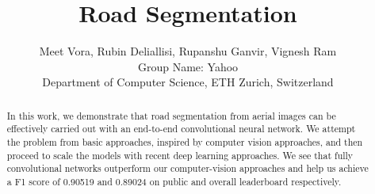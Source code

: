 \documentclass[10pt,conference,compsocconf]{IEEEtran}
\begin{document}
\title{Road Segmentation}

\author{
  Meet Vora, Rubin Deliallisi, Rupanshu Ganvir, Vignesh Ram \\
  Group Name: Yahoo \\
  Department of Computer Science, ETH Zurich, Switzerland
}

\maketitle

\begin{abstract}
In this work, we demonstrate that road segmentation from aerial images can be effectively carried out with an end-to-end convolutional neural network. We attempt the problem from basic approaches, inspired by computer vision approaches, and then proceed to scale the models with recent deep learning approaches. We see that fully convolutional networks outperform our computer-vision approaches and help us achieve a F1 score of 0.90519 and 0.89024 on public and overall leaderboard respectively. 
\end{abstract}










\end{document}
